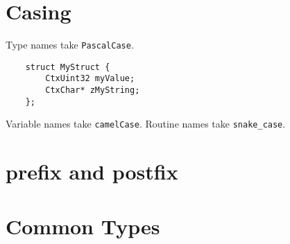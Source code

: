 \documentclass{report}
\begin{document}
\section{Casing}
Type names take \texttt{PascalCase}.
\begin{verbatim}
    struct MyStruct {
        CtxUint32 myValue;
        CtxChar* zMyString;
    };
\end{verbatim}
Variable names take \texttt{camelCase}.
Routine names take \texttt{snake\_case}.

\section{prefix and postfix}

\section{Common Types}
\end{document}
